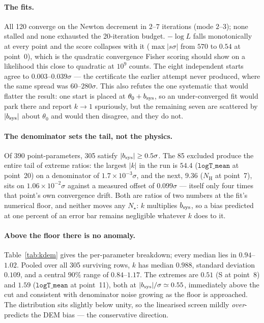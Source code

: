 \documentclass[11pt,a4paper]{article}
\newcommand{\nh}{N_{\mathrm{H}}}
\newcommand{\code}[1]{\texttt{#1}}
\begin{document}
\paragraph{The fits.} All 120 converge on the Newton decrement in $2$--$7$
iterations (mode $2$--$3$); none stalled and none exhausted the 20-iteration
budget. $-\log L$ falls monotonically at every point and the score collapses
with it ($\max|s\sigma|$ from $570$ to $0.54$ at point~0), which is the
quadratic convergence Fisher scoring should show on a likelihood this close to
quadratic at $10^9$ counts. The eight independent starts agree to
$0.003$--$0.039\sigma$ --- the certificate the earlier attempt never produced,
where the same spread was $60$--$280\sigma$. This also refutes the one
systematic that would flatter the result: one start is placed at
$\theta_0+b_{\rm sys}$, so an under-converged fit would park there and report
$k\to1$ spuriously, but the remaining seven are scattered by $|b_{\rm sys}|$
about $\theta_0$ and would then disagree, and they do not.

\paragraph{The denominator sets the tail, not the physics.} Of 390
point-parameters, 305 satisfy $|b_{\rm sys}|\ge0.5\sigma$. The 85 excluded
produce the entire tail of extreme ratios: the largest $|k|$ in the run is
$54.4$ ($\code{logT\_mean}$ at point~20) on a denominator of
$1.7\times10^{-3}\sigma$, and the next, $9.36$ ($\nh$ at point~7), sits on
$1.06\times10^{-2}\sigma$ against a measured offset of $0.099\sigma$ --- itself
only four times that point's own convergence drift. Both are ratios of two
numbers at the fit's numerical floor, and neither moves any $N_\star$: $k$
multiplies $b_{\rm sys}$, so a bias predicted at one percent of an error bar
remains negligible whatever $k$ does to it.

\paragraph{Above the floor there is no anomaly.} Table~\ref{tab:kdem} gives the
per-parameter breakdown; every median lies in $0.94$--$1.02$. Pooled over all
305 surviving rows, $k$ has median $0.988$, standard deviation $0.109$, and a
central $90\%$ range of $0.84$--$1.17$. The extremes are $0.51$ (S at point~8)
and $1.59$ ($\code{logT\_mean}$ at point~11), both at $|b_{\rm sys}|/\sigma
\simeq0.55$, immediately above the cut and consistent with denominator noise
growing as the floor is approached. The distribution sits slightly below unity,
so the linearised screen mildly \emph{over}-predicts the DEM bias --- the
conservative direction.
\end{document}
